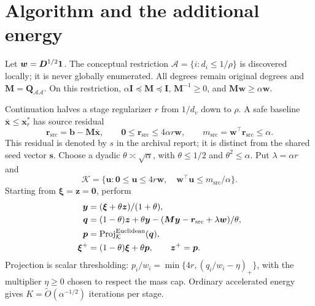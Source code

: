 \documentclass[11pt]{article}
\begin{document}
\section{Algorithm and the additional energy}
\label{sec:archive-algorithm}
Let $\bm{w}=\bm{D}^{1/2}\mathbf{1}$. The conceptual restriction
$\mathcal A=\{i:d_i\leq1/\rho\}$ is discovered locally; it is never globally
enumerated. All degrees remain original degrees and
$\bm{M}=\bm{Q}_{\mathcal A\mathcal A}$.
On this restriction, $\alpha\bm{I}\preceq\bm{M}\preceq\bm{I}$,
$\bm{M}^{-1}\geq0$, and $\bm{M}\bm{w}\geq\alpha\bm{w}$.

Continuation halves a stage regularizer $r$ from $1/d_v$ down to $\rho$.
A safe baseline $\overline{\bm{x}}\leq\bm{x}_r^*$ has source residual
\[
 \bm{r}_{\mathrm{src}}=\bm{b}-\bm{M}\overline{\bm{x}},\qquad
 \bm{0}\leq\bm{r}_{\mathrm{src}}\leq4\alpha r\bm{w},\qquad
 m_{\mathrm{src}}=\bm{w}^{\top}\bm{r}_{\mathrm{src}}\leq\alpha.
\]
This residual is denoted by $s$ in the archival report; it is distinct from
the shared seed vector $\bm{s}$. Choose a dyadic
$\theta\asymp\sqrt\alpha$, with $\theta\leq1/2$ and $\theta^2\leq\alpha$.
Put $\lambda=\alpha r$ and
\[
 \mathcal K=\{\bm{u}:\bm{0}\leq\bm{u}\leq4r\bm{w},\quad
                \bm{w}^{\top}\bm{u}\leq m_{\mathrm{src}}/\alpha\}.
\]
Starting from $\bm{\xi}=\bm{z}=\bm{0}$, perform
\begin{equation}\label{eq:det-op2-step}
\begin{aligned}
 \bm{y}&=(\bm{\xi}+\theta\bm{z})/(1+\theta),\\
 \bm{q}&=(1-\theta)\bm{z}+\theta\bm{y}
       -(\bm{M}\bm{y}-\bm{r}_{\mathrm{src}}+\lambda\bm{w})/\theta,\\
 \bm{p}&=\operatorname{Proj}_{\mathcal K}^{\rm Euclidean}(\bm{q}),\\
 \bm{\xi}^{+}&=(1-\theta)\bm{\xi}+\theta\bm{p},\qquad
 \bm{z}^{+}=\bm{p}.
\end{aligned}
\end{equation}
Projection is scalar thresholding:
$p_i/w_i=\min\{4r,(q_i/w_i-\eta)_+\}$, with the multiplier $\eta\geq0$
chosen to respect the mass cap. Ordinary accelerated energy gives
$K=\widetilde O(\alpha^{-1/2})$ iterations per stage.
\end{document}
